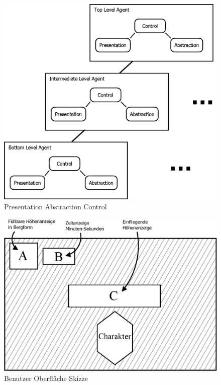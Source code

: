 \begin{figure}[H]
\centering
\caption{Presentation Abstraction Control}
\label{Abb:PAC}
\includegraphics[width=\textwidth, height=0.6\textheight]{Bilder/Diagramme/PAC.png}
\end{figure}
\newpage{}

\begin{figure}[H]
\centering
\caption{Benutzer Oberfläche Skizze}\vspace{0.5cm}
\label{Abb:UISkizze}
\includegraphics[scale=0.22]{Bilder/Diagramme/UserInterface.png}
\end{figure}

